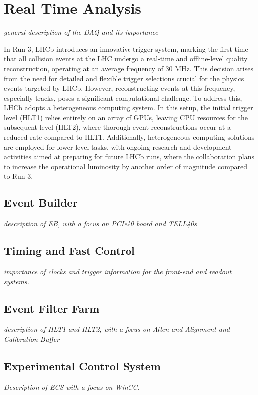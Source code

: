 \section{Real Time Analysis}
\textit{general description of the DAQ and its importance}

In Run 3, LHCb introduces an innovative trigger system, marking the first time that all collision events at the LHC undergo a real-time and offline-level quality reconstruction, operating at an average frequency of 30 MHz. This decision arises from the need for detailed and flexible trigger selections crucial for the physics events targeted by LHCb. However, reconstructing events at this frequency, especially tracks, poses a significant computational challenge. To address this, LHCb adopts a heterogeneous computing system. In this setup, the initial trigger level (HLT1) relies entirely on an array of GPUs, leaving CPU resources for the subsequent level (HLT2), where thorough event reconstructions occur at a reduced rate compared to HLT1. Additionally, heterogeneous computing solutions are employed for lower-level tasks, with ongoing research and development activities aimed at preparing for future LHCb runs, where the collaboration plans to increase the operational luminosity by another order of magnitude compared to Run 3.\\
\subsection{Event Builder}
\textit{description of EB, with a focus on PCIe40 board and TELL40s
}

\subsection{Timing and Fast Control}
\textit{importance of clocks and trigger information for the front-end and readout systems.
}

\subsection{Event Filter Farm}
\textit{description of HLT1 and HLT2, with a focus on Allen and Alignment and Calibration Buffer
}

\subsection{Experimental Control System}
\textit{Description of ECS with a focus on WinCC.
}


